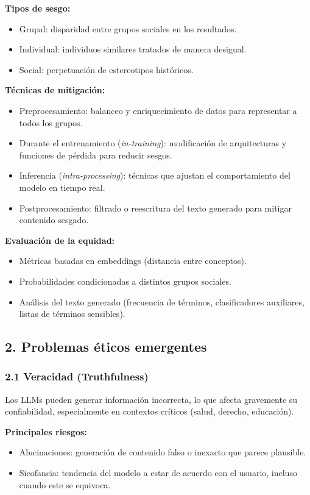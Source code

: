 \documentclass{article}
\begin{document}
\textbf{Tipos de sesgo:}
\begin{itemize}[leftmargin=3.5em]
    \item Grupal: disparidad entre grupos sociales en los resultados.
    \item Individual: individuos similares tratados de manera desigual.
    \item Social: perpetuación de estereotipos históricos.
\end{itemize}

\textbf{Técnicas de mitigación:}
\begin{itemize} [leftmargin=3.5em]
    \item Preprocesamiento: balanceo y enriquecimiento de datos para representar a todos los grupos.
    \item Durante el entrenamiento (\emph{in-training}): modificación de arquitecturas y funciones de pérdida para reducir sesgos.
    \item Inferencia (\emph{intra-processing}): técnicas que ajustan el comportamiento del modelo en tiempo real.
    \item Postprocesamiento: filtrado o reescritura del texto generado para mitigar contenido sesgado.
\end{itemize}

\textbf{Evaluación de la equidad:}
\begin{itemize}[leftmargin=3.5em]
    \item Métricas basadas en embeddings (distancia entre conceptos).
    \item Probabilidades condicionadas a distintos grupos sociales.
    \item Análisis del texto generado (frecuencia de términos, clasificadores auxiliares, listas de términos sensibles).
\end{itemize}

\subsection*{2. Problemas éticos emergentes}

\subsubsection* {2.1 Veracidad (Truthfulness)}
Los LLMs pueden generar información incorrecta, lo que afecta gravemente su confiabilidad, especialmente en contextos críticos (salud, derecho, educación).

\textbf{Principales riesgos:}
\begin{itemize} [leftmargin=3.5em]
    \item Alucinaciones: generación de contenido falso o inexacto que parece plausible.
    \item Sicofancia: tendencia del modelo a estar de acuerdo con el usuario, incluso cuando este se equivoca.
\end{itemize}
\end{document}
